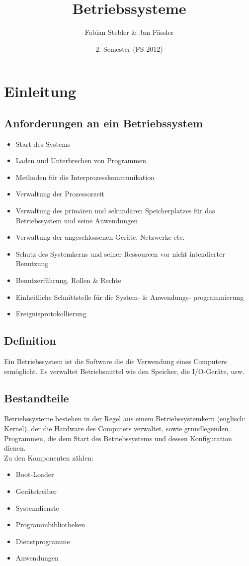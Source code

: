 \documentclass[a4paper, 10pt]{article}
\title{Betriebssysteme}
\author{Fabian Stebler \& Jan F\"assler}
\date{2. Semester (FS 2012)}
\begin{document}
\maketitle
\thispagestyle{fancy}

\newpage


\tableofcontents	  	


\newpage
\setcounter{page}{1}
\section{Einleitung}

\subsection{Anforderungen an ein Betriebssystem}
\begin{itemize}
	\item Start des Systems
	\item Laden und Unterbrechen von Programmen
	\item Methoden für die Interprozesskommunikation
	\item Verwaltung der Prozessorzeit
	\item Verwaltung des primären und sekundären Speicherplatzes für das Betriebssystem und seine Anwendungen
	\item Verwaltung der angeschlossenen Geräte, Netzwerke etc.
	\item Schutz des Systemkerns und seiner Ressourcen vor nicht intendierter Benutzung
	\item Benutzerführung, Rollen \& Rechte	
	\item Einheitliche Schnittstelle für die System- \& Anwendungs- programmierung
	\item Ereignisprotokollierung
\end{itemize}
\subsection{Definition}
Ein Betriebssystem ist die Software die die Verwendung eines Computers erm\"oglicht. Es verwaltet Betriebsmittel wie den Speicher, die I/O-Ger\"ate, usw.
\subsection{Bestandteile}
Betriebssysteme bestehen in der Regel aus einem Betriebssystemkern (englisch: Kernel), der die Hardware des Computers verwaltet, sowie grundlegenden Programmen, die dem Start des Betriebssystems und dessen Konfiguration dienen.\\
Zu den Komponenten z\"ahlen:
\begin{itemize}
\item Boot-Loader
\item Ger\"atetreiber
\item Systemdienste
\item Programmbibliotheken
\item Dienstprogramme
\item Anwendungen
\end{itemize}
\end{document}
